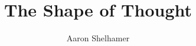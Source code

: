 \documentclass[a5paper,twoside,fontsize=9pt,pagesize=auto]{scrbook}
\begin{document}
\title{The Shape of Thought}
\author{Aaron Shelhamer}
\frontmatter
\maketitle
\mainmatter

\end{document}
